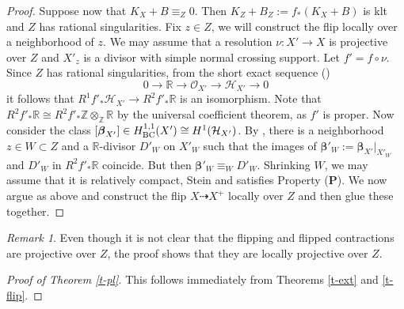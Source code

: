 \documentclass[12pt]{amsart}
\theoremstyle{plain}
\theoremstyle{remark}
\newtheorem{remark}[theorem]{Remark}
\theoremstyle{definition}
\newcommand{\<}{\leq}
\newcommand{\mbR}{\mathbb{R}}
\newcommand{\OO}{{\mathcal{O}}}
\newcommand{\R}{{\mathbb{R}}}
\newcommand{\mbZ}{\mathbb{Z}}
\def\bbeta{\boldsymbol{\beta}}
\theoremstyle{definition}
\theoremstyle{definition}
\numberwithin{equation}{section}
\theoremstyle{remark}
\begin{document}
\begin{proof}
Suppose now that $K_X+B \equiv _Z0$. Then $K_Z+B_Z:=f_*(K_X+B)$ is klt and $Z$ has rational singularities.  Fix $z\in Z$, we will construct the flip locally over a neighborhood of $z$. We may assume that a resolution $\nu:X'\to X$ is projective over $Z$ and $X'_z$  is a divisor with simple normal crossing support. Let $f'=f\circ \nu$. Since $Z$ has rational singularities, from the short exact sequence  (\cite[\S 3, eqn. (2)]{HP16})
\[0\to \R \to \OO _{X'}\to \mathcal H _{X'}\to 0\]
it follows that $R^1f'_*\mathcal H _{X'}\to R^2f'_*\R$ is an isomorphism. Note that $ R^2f'_*\R\cong R^2f'_*\mbZ\otimes_{\mbZ}\mbR$ by the universal coefficient theorem, as $f'$ is proper. Now consider the class $[\bbeta  _{X'}]\in H^{1,1}_{\rm BC}(X')\cong H^1(
\mathcal H _{X'})$. By \cite[Lemma 12.1.1]{KM92}, there is a neighborhood $z\in W\subset Z$ and a $\R$-divisor $D'_W$ on $X'_W$ such that  the images of $\bbeta'_W:=\bbeta_{X'}|_{X'_W}$ and $D'_W$ in $R^2f'_*\R$ coincide. But then $\bbeta '_W\equiv _W D'_W$. Shrinking $W$, we may assume that it is relatively compact, Stein and satisfies Property ({\bf P}). We now argue as above and construct the flip $X\dasharrow X^+$ locally over $Z$ and then glue these together.\end{proof}

\begin{remark} 
	Even though it is not clear that the flipping and flipped contractions are projective over $Z$, the proof shows that they are locally projective over $Z$.
\end{remark}



\begin{proof}[Proof of Theorem \ref{t-pl}]
This follows immediately from Theorems \ref{t-ext} and \ref{t-flip}.
\end{proof}















\end{document}
